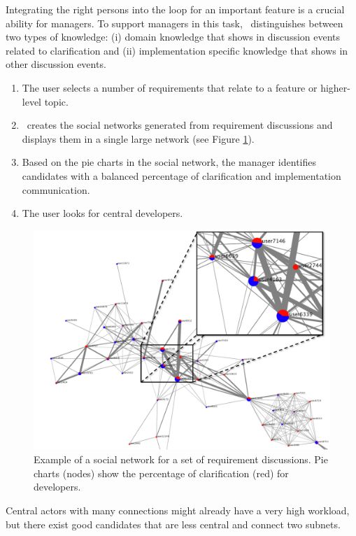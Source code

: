 Integrating the right persons into the loop for an important feature is a crucial ability for managers.
To support managers in this task, \viss\ distinguishes between two types of knowledge: (i) domain knowledge that shows in discussion events related to clarification and (ii) implementation specific knowledge that shows in other discussion events.
\begin{enumerate}
\item The user selects a number of requirements that relate to a feature or higher-level topic. 
\item \viss\ creates the social networks generated from requirement discussions and displays them in a single large network (see Figure \ref{fig:example-sn-large}).
\item Based on the pie charts in the social network, the manager identifies candidates with a balanced percentage of clarification and implementation communication.
\item The user looks for central developers. 
\end{enumerate}
\begin{figure}
\centering
\includegraphics[width=1\columnwidth]{img/example-sn-large}
\caption{Example of a social network for a set of requirement discussions. 
Pie charts (nodes) show the percentage of clarification (red) for developers.
}
\label{fig:example-sn-large}
\end{figure}
Central actors with many connections might already have a very high workload, but there exist good candidates that are less central and connect two subnets.
